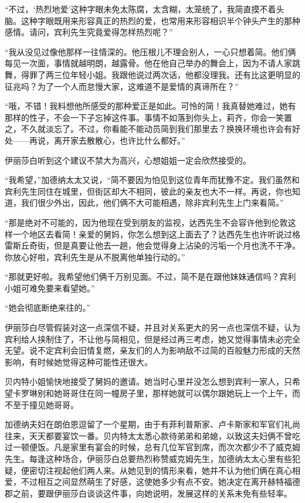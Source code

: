 \par “不过，‘热烈地爱’这种字眼未免太陈腐，太含糊，太笼统了，我简直摸不着头脑。这种字眼既用来形容真正的热烈的爱，也常用来形容相识半个钟头产生的那种感情。请问，宾利先生究竟爱得怎样热烈呢？”
\par “我从没见过像他那样一往情深的。他压根儿不理会别人，一心只想着简。他们俩每见一次面，事情就越明朗，越露骨。他在他自己举办的舞会上，因为不请人家跳舞，得罪了两三位年轻小姐。我跟他说过两次话，他都没理我。还有比这更明显的征兆吗？为了一个人而怠慢大家，这难道不是爱情的真谛所在？”
\par “哦，不错！我料想他所感受的那种爱正是如此。可怜的简！我真替她难过，她有那样的性子，不会一下子忘掉这件事。事情不如落到你头上，莉齐，你会一笑置之，不久就淡忘了。不过，你看能不能动员简到我们那里去？换换环境也许会有好处——再说，离开家去散散心，也许比什么都好。”
\par 伊丽莎白听到这个建议不禁大为高兴，心想姐姐一定会欣然接受的。
\par “我希望，”加德纳太太又说，“简不要因为怕见到这位青年而犹豫不定。我们虽然和宾利先生同住在城里，但街区却大不相同，彼此的亲友也大不一样。再说，你也知道，我们很少外出，因此，他们俩不大可能相遇，除非宾利先生上门来看简。”
\par “那是绝对不可能的，因为他现在受到朋友的监视，达西先生不会容许他到伦敦这样一个地区去看简！亲爱的舅妈，你怎么想到这上面去了？达西先生也许听说过格雷斯丘奇街，但是真要让他去一趟，他会觉得身上沾染的污垢一个月也洗不干净。你放心好啦，宾利先生是从不脱离他单独行动的。”
\par “那就更好啦。我希望他们俩千万别见面。不过，简不是在跟他妹妹通信吗？宾利小姐可难免要来看望她。”
\par “她会彻底断绝来往的。”
\par 伊丽莎白尽管假装对这一点深信不疑，并且对关系更大的另一点也深信不疑，认为宾利给人挟制住了，不让他与简相见，但是经过再三考虑，她又觉得事情未必完全无望。说不定宾利会旧情复燃，亲友们的人为影响敌不过简的百般魅力形成的天然影响，有时候她觉得这种可能性还很大。
\par 贝内特小姐愉快地接受了舅妈的邀请。她当时心里并没怎么想到宾利一家人，只希望卡罗琳别和她哥哥住在同一幢房子里，那样她就可以偶尔跟她玩上一个上午，而不至于撞见她哥哥。
\par 加德纳夫妇在朗伯恩逗留了一个星期，由于有菲利普斯家、卢卡斯家和军官们礼尚往来，天天都要宴饮一番。贝内特太太悉心款待弟弟和弟媳，以致这夫妇俩不曾吃过一顿便饭。凡是家里有宴会的时候，总有几位军官到席，而次次都少不了威克姆先生。每逢这种场合，伊丽莎白总要热烈称赞威克姆先生，加德纳太太心里有些犯疑，便密切注视起他们两人来。从她见到的情形来看，她并不认为他们俩在真心相爱，不过相互之间显然萌生了好感，这使她多少有点不安。她决定在离开赫特福德郡之前，要跟伊丽莎白谈谈这件事，向她说明，发展这样的关系未免有些轻率。
